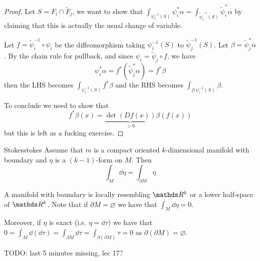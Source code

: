 \documentclass[12pt]{extarticle}
\begin{document}
\begin{proof}
	Let $S = F_i \cap \tilde F_j$, we want to show that
	$\int_{\psi_i^{-1}(S)} \psi^*_i \alpha = \int_{\tilde \psi_i^{-1}(S)} \tilde \psi^*_i \alpha$ by
	claiming that this is actually the usual change of variable.

	Let $f = \tilde \psi_i^{-1} \circ \psi_i$ be the diffeomorphism taking $\psi_i^{-1}(S)$ to
	$\tilde \psi_j^{-1}(S)$. Let $\beta = \tilde \psi_j^* \alpha$.
	By the chain rule for pullback, and since $\psi_i = \tilde \psi_j \circ f$, we have
	\begin{equation}
		\psi_i^* \alpha = f^* (\tilde \psi_j^* \alpha) = f^* \beta
	\end{equation}
	then the LHS becomes $\int_{\psi_i^{-1}(S)} f^* \beta$ and the RHS becomes
	$\int_{f(\psi_i^{-1}(S)} \beta$.

	To conclude we need to show that
	\begin{equation}
		f^* \beta (x) = \underbrace{\det (Df(x))}_{>0} \beta(f(x))
	\end{equation}
	but this is left as a fucking exercise.
\end{proof}

\begin{theorem}{Stokes}{stokes}
	Assume that $m$ is a compact oriented $k$-dimensional manifold with boundary and $\eta$ is a
	$(k-1)$-form on $M$.
	Then
	\begin{equation}
		\int_{M} \dd \eta = \int_{\partial M} \eta
	\end{equation}
\end{theorem}

A manifold with boundary is locally resembling $\R^k$ or a lower half-space of $\R^k$.
Note that if $\partial M = \varnothing$ we have that $\int_M \dd \eta = 0$.

Moreover, if $\eta$ is exact (i.e. $\eta = \dd \tau$) we have that
$0 = \int_M \dd(\dd \tau) = \int_{\partial M} \dd \tau = \int_{\partial(\partial M)} \tau = 0$ as
$\partial(\partial M) = \varnothing$.

TODO: last 5 minutes missing, lec 17?
\end{document}

